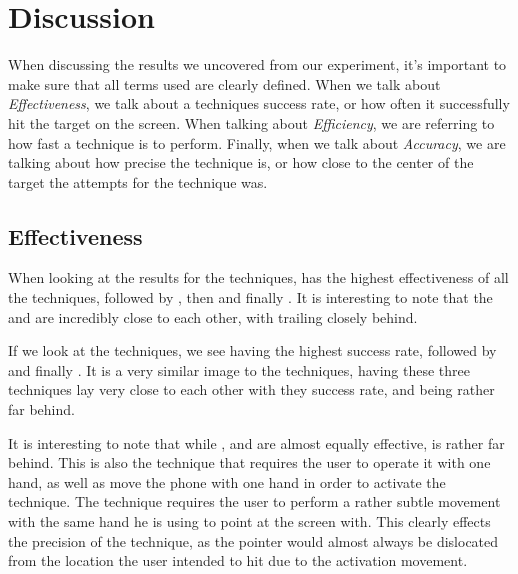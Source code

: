 \section{Discussion}\label{sec:discussion}
When discussing the results we uncovered from our experiment, it's important to make sure that all terms used are clearly defined. When we talk about \emph{Effectiveness}, we talk about a techniques success rate, or how often it successfully hit the target on the screen. When talking about \emph{Efficiency}, we are referring to how fast a technique is to perform. Finally, when we talk about \emph{Accuracy}, we are talking about how precise the technique is, or how close to the center of the target the attempts for the technique was. 

\subsection{Effectiveness}

When looking at the results for the \push techniques, \grab has the highest effectiveness of all the techniques, followed by \swipe, then \throw and finally \tilt. It is interesting to note that the \grab and \swipe are incredibly close to each other, with \throw trailing closely behind. 

If we look at the \pull techniques, we see \swipe having the highest success rate, followed by \throw and finally \grab. It is a very similar image to the \push techniques, having these three techniques lay very close to each other with they success rate, and \tilt being rather far behind.  

It is interesting to note that while \grab, \swipe and \throw are almost equally effective, \tilt is rather far behind. This is also the technique that requires the user to operate it with one hand, as well as move the phone with one hand in order to activate the technique. The technique requires the user to perform a rather subtle movement with the same hand he is using to point at the screen with. This clearly effects the precision of the technique, as the pointer would almost always be dislocated from the location the user intended to hit due to the activation movement.

